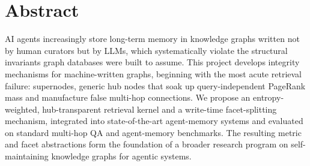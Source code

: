 \documentclass[11pt,a4paper]{article}
\begin{document}
\section*{Abstract}

AI agents increasingly store long-term memory in knowledge graphs written not by human curators but by LLMs, which systematically violate the structural invariants graph databases were built to assume. This project develops integrity mechanisms for machine-written graphs, beginning with the most acute retrieval failure: supernodes, generic hub nodes that soak up query-independent PageRank mass and manufacture false multi-hop connections. We propose an entropy-weighted, hub-transparent retrieval kernel and a write-time facet-splitting mechanism, integrated into state-of-the-art agent-memory systems and evaluated on standard multi-hop QA and agent-memory benchmarks. The resulting metric and facet abstractions form the foundation of a broader research program on self-maintaining knowledge graphs for agentic systems.
\end{document}
